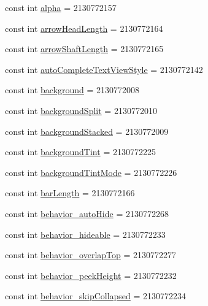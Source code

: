 \begin{CompactItemize}
\item 
const int \hyperlink{class__2doo_1_1_droid_1_1_resource_1_1_attribute_ee0faaf23b4c66fa67721a7b2ee76cbc}{alpha} = 2130772157
\item 
const int \hyperlink{class__2doo_1_1_droid_1_1_resource_1_1_attribute_6cd2df1e99515de4c9494e2330b57b51}{arrowHeadLength} = 2130772164
\item 
const int \hyperlink{class__2doo_1_1_droid_1_1_resource_1_1_attribute_58567e826986c3db975085229cfc26a7}{arrowShaftLength} = 2130772165
\item 
const int \hyperlink{class__2doo_1_1_droid_1_1_resource_1_1_attribute_5f0eb5488cc15818f22a1013e6ffd748}{autoCompleteTextViewStyle} = 2130772142
\item 
const int \hyperlink{class__2doo_1_1_droid_1_1_resource_1_1_attribute_074c95131bdf9c467e533004578c702a}{background} = 2130772008
\item 
const int \hyperlink{class__2doo_1_1_droid_1_1_resource_1_1_attribute_4a83c34579a9f842a8e731b8a01b814d}{backgroundSplit} = 2130772010
\item 
const int \hyperlink{class__2doo_1_1_droid_1_1_resource_1_1_attribute_d95393c204251453ef2fd03e1e8e67cf}{backgroundStacked} = 2130772009
\item 
const int \hyperlink{class__2doo_1_1_droid_1_1_resource_1_1_attribute_8d6a0328c830dfbd23bb535c07a4f92e}{backgroundTint} = 2130772225
\item 
const int \hyperlink{class__2doo_1_1_droid_1_1_resource_1_1_attribute_39e9488f6096ad965e5afce3e5c39a76}{backgroundTintMode} = 2130772226
\item 
const int \hyperlink{class__2doo_1_1_droid_1_1_resource_1_1_attribute_07d73b481b7926d2df05cc8286fb7fb4}{barLength} = 2130772166
\item 
const int \hyperlink{class__2doo_1_1_droid_1_1_resource_1_1_attribute_cc4a9fdbf5763d851ffb78529852656a}{behavior\_\-autoHide} = 2130772268
\item 
const int \hyperlink{class__2doo_1_1_droid_1_1_resource_1_1_attribute_0e3072b3e370edcc52c92616f884c5b5}{behavior\_\-hideable} = 2130772233
\item 
const int \hyperlink{class__2doo_1_1_droid_1_1_resource_1_1_attribute_eb17a155921cd0a1888626dea907e703}{behavior\_\-overlapTop} = 2130772277
\item 
const int \hyperlink{class__2doo_1_1_droid_1_1_resource_1_1_attribute_a54e731cbe8e5daffeb0924511975a9c}{behavior\_\-peekHeight} = 2130772232
\item 
const int \hyperlink{class__2doo_1_1_droid_1_1_resource_1_1_attribute_54b08da3775f61a2e300f179804f64c9}{behavior\_\-skipCollapsed} = 2130772234

\end{CompactItemize}
